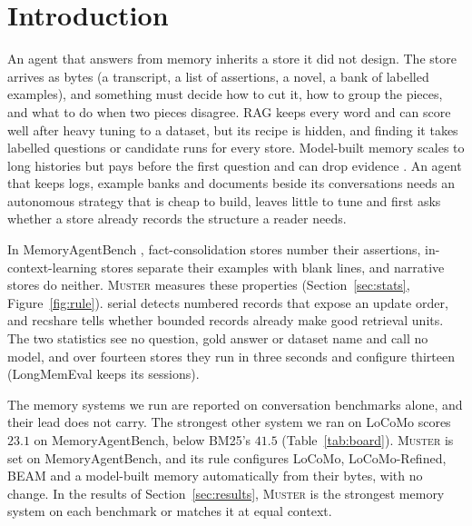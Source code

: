 \documentclass{article}
\newcommand{\sys}{\textsc{Muster}}
\newcommand{\serial}{\textsf{serial}}
\newcommand{\cov}{\textsf{recshare}}
\begin{document}
\section{Introduction}

An agent that answers from memory inherits a store it did not design. The store arrives as bytes (a
transcript, a list of assertions, a novel, a bank of labelled examples), and something must decide how to cut
it, how to group the pieces, and what to do when two pieces disagree. RAG keeps every word and can score well after heavy tuning to a dataset, but its recipe is hidden, and finding it takes labelled questions or candidate runs for every store. Model-built memory scales to long histories but pays before the first question and can drop evidence \cite{fidelity}. An agent that keeps logs, example banks and documents beside its conversations needs an autonomous strategy that is cheap to build, leaves little to tune and first asks whether a store already records the structure a reader needs.

In MemoryAgentBench \cite{mab}, fact-consolidation stores number their assertions,
in-context-learning stores separate their examples with blank lines, and narrative stores do neither. \sys{}
measures these properties (Section~\ref{sec:stats}, Figure~\ref{fig:rule}). \serial{} detects numbered records that
expose an update order, and \cov{} tells whether bounded records already make good retrieval units. The
two statistics see no question, gold answer or dataset name and call no model, and over fourteen stores they run
in three seconds and configure thirteen (LongMemEval keeps its sessions).

The memory systems we run are reported on conversation benchmarks alone, and their lead does not carry. The strongest other system we ran on LoCoMo scores $23.1$ on MemoryAgentBench, below BM25's $41.5$ (Table~\ref{tab:board}). \sys{} is set on MemoryAgentBench, and its rule configures LoCoMo, LoCoMo-Refined, BEAM and a model-built memory automatically from their bytes, with no change. In the results of Section~\ref{sec:results}, \sys{} is the strongest memory system on each benchmark or matches it at equal context.
\end{document}
